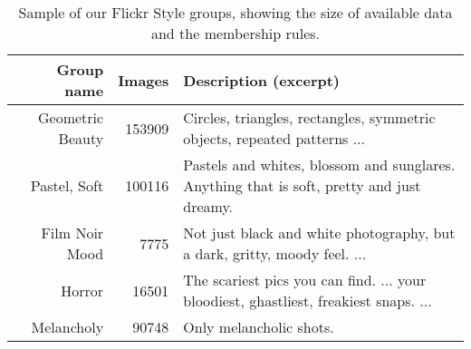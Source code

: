 
\begin{table}
\caption {Sample of our Flickr Style groups, showing the size of available data and the membership rules.}
\label{tab:flickr_style}
{\small
    \begin{tabularx}{\linewidth}{rrX}
    \textbf{Group name}       & \textbf{Images} & \textbf{Description (excerpt)}                                                                                                                                                                             \\ \hline
    Geometric Beauty & 153909           & Circles, triangles, rectangles, symmetric objects, repeated patterns ...                                                                                            \\
    Pastel, Soft     & 100116           & Pastels and whites, blossom and sunglares. Anything that is soft, pretty and just dreamy.                                             \\
    Film Noir Mood   & 7775             & Not just black and white photography, but a dark, gritty, moody feel. ... \\
    Horror           & 16501            & The scariest pics you can find. ... your bloodiest, ghastliest, freakiest snaps. ...                       \\
    Melancholy       & 90748            & Only melancholic shots.                                                                                                                                                                           \\
    \end{tabularx}
}
\end{table}
